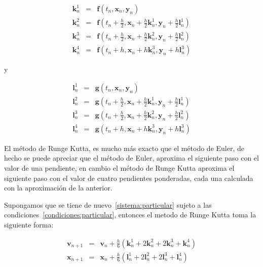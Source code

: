 \begin{eqnarray}
\textbf{k}_{n}^{1} & = & \textbf{f}(t_n, \textbf{x}_n, \textbf{y}_n) \nonumber \\
\textbf{k}_{n}^{2} & = & \textbf{f}(t_n + \frac{h}{2}, \textbf{x}_n + \frac{h}{2} \textbf{k}_{n}^{1}, \textbf{y}_n + \frac{h}{2}\textbf{l}_{n}^{1}) \nonumber \\
\textbf{k}_{n}^{3} & = & \textbf{f}(t_n + \frac{h}{2}, \textbf{x}_n + \frac{h}{2} \textbf{k}_{n}^{2}, \textbf{y}_n + \frac{h}{2}\textbf{l}_{n}^{2}) \nonumber \\
\textbf{k}_{n}^{4} & = & \textbf{f}(t_n + h, \textbf{x}_n + h\textbf{k}_{n}^{3}, \textbf{y}_n + h\textbf{l}_{n}^{3}) \nonumber
\end{eqnarray}

y

\begin{eqnarray}
\textbf{l}_{n}^{1} & = & \textbf{g}(t_n, \textbf{x}_n, \textbf{y}_n) \nonumber \\
\textbf{l}_{n}^{2} & = & \textbf{g}(t_n + \frac{h}{2}, \textbf{x}_n + \frac{h}{2} \textbf{k}_{n}^{1}, \textbf{y}_n + \frac{h}{2}\textbf{l}_{n}^{1}) \nonumber \\
\textbf{l}_{n}^{3} & = & \textbf{g}(t_n + \frac{h}{2}, \textbf{x}_n + \frac{h}{2} \textbf{k}_{n}^{2}, \textbf{y}_n + \frac{h}{2}\textbf{l}_{n}^{2}) \nonumber \\
\textbf{l}_{n}^{4} & = & \textbf{g}(t_n + h, \textbf{x}_n + h\textbf{k}_{n}^{3}, \textbf{y}_n + h\textbf{l}_{n}^{3}) \nonumber
\end{eqnarray}


El método de Runge Kutta, es mucho más exacto que el método de Euler, de hecho se puede apreciar que el método de Euler, aproxima el siguiente paso con el valor de una pendiente, en cambio el método de Runge Kutta aproxima el siguiente paso con el valor de cuatro pendientes ponderadas, cada una calculada con la aproximación de la anterior.

Supongamos que se tiene de nuevo~\eqref{sistema:particular} sujeto a las condiciones~\eqref{condiciones:particular}, entonces el metodo de Runge Kutta toma la siguiente forma:

\begin{eqnarray}
\textbf{v}_{n+1} & = & \textbf{v}_n + \frac{h}{6}(\textbf{k}_{n}^{1} + 2\textbf{k}_{n}^{2} + 2\textbf{k}_{n}^{3} + \textbf{k}_{n}^{4}) \nonumber \\
\textbf{x}_{n+1} & = & \textbf{x}_n + \frac{h}{6}(\textbf{l}_{n}^{1} + 2\textbf{l}_{n}^{2} + 2\textbf{l}_{n}^{3} + \textbf{l}_{n}^{4})
\label{formulas:RK4}
\end{eqnarray}

